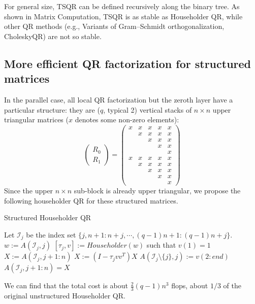 \documentclass{article}
\begin{document}
For general size, TSQR can be defined recursively along the binary tree. As shown in Matrix Computation, TSQR is as stable as Householder QR, while other QR methods (e.g., Variants of Gram--Schmidt orthogonalization, CholeskyQR) are not so stable.

\subsection{More efficient QR factorization for structured matrices}
In the parallel case, all local QR factorization but the zeroth layer have a particular structure:  they are ($q$, typical 2) vertical stacks of $n\times n$ upper triangular matrices ($x$ denotes some non-zero elements): \begin{equation}\left(\begin{array}{c}
R_{0} \\
R_{1}
\end{array}\right)=\left(\begin{array}{lllll}
x & x & x & x & x \\
& x & x & x & x \\
& & x & x & x \\
& & & x & x \\
& & & & x \\
x & x & x & x & x \\
& x & x & x & x \\
& & x & x & x \\
& & & x & x \\
& & & & x
\end{array}\right)\end{equation}
Since the upper $n\times n$ sub-block is already upper triangular, we propose the following householder QR for these structured matrices.
\begin{algorithm}[htbp]
	\caption{Structured Householder QR}
	\begin{algorithmic}[1]
		\STATE Let $\mathcal I_j$ be the index set $\{j, n+1:n+j, \cdots, (q-1)n+1:(q-1)n+j\}.$
		\STATE $w:=A(\mathcal I_j,j)$
		\STATE $[\tau_j, v] := Householder(w)$ such that $v(1) = 1$
		\STATE $X:= A(\mathcal I_j, j+1:n)$
		\STATE $X := (I - \tau_j vv^T)X$
		\STATE $A(\mathcal I_j \setminus \{j\}, j):= v(2:end)$
		\STATE $A(\mathcal I_j, j+1:n) = X$
		\ENDFOR 
	\end{algorithmic}
\end{algorithm}

We can find that the total cost is about $\frac 23 (q-1)n^3$ flops, about $1/3$ of the original unstructured Householder QR.
\end{document}
